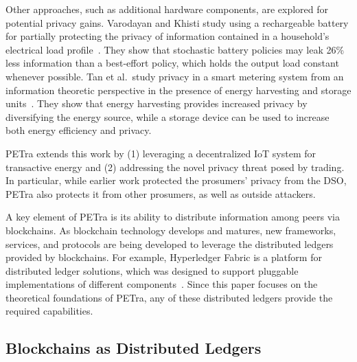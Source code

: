 Other approaches, such as additional hardware components, are explored
for potential privacy gains. Varodayan and Khisti study using a
rechargeable battery for partially protecting the privacy of
information contained in a household's electrical load
profile~\cite{varodayan2011smart}. They show that stochastic battery
policies may leak 26\% less information than a best-effort policy,
which holds the output load constant whenever possible. Tan et
al.\ study privacy in a smart metering system from an information
theoretic perspective in the presence of energy harvesting and storage
units~\cite{tan2013increasing}. They show that energy harvesting
provides increased privacy by diversifying the energy source, while a
storage device can be used to increase both energy efficiency and
privacy.

PETra extends this work by (1) leveraging a decentralized IoT
system for transactive energy and (2) addressing the novel privacy
threat posed by trading. In particular, while earlier work protected
the prosumers' privacy from the DSO, PETra also protects it from other
prosumers, as well as outside attackers.

A key element of PETra is its ability to distribute information among
peers via blockchains.  As blockchain technology develops and matures,
new frameworks, services, and protocols are being developed to
leverage the distributed ledgers provided by blockchains. For example,
Hyperledger Fabric is a platform for distributed ledger solutions,
which was designed to support pluggable implementations of different
components~\cite{hyperledger2017fabric}.
Since this paper focuses on the theoretical foundations of PETra, any
of these distributed ledgers provide the required capabilities.


\iffalse
\subsection{Blockchains as Distributed Ledgers}

